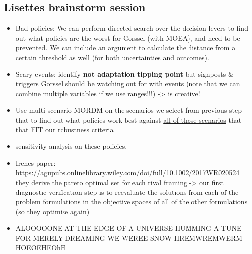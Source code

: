 \subsection{Lisettes brainstorm session}
\begin{itemize}
    \item Bad policies: We can perform directed search over the decision levers to find out what policies are the worst for Gorssel (with MOEA), and need to be prevented. We can include an argument to calculate the distance from a certain threshold as well (for both uncertainties and outcomes).
    
    
    \item Scary events: identify \textbf{not adaptation tipping point} but signposts \& triggers Gorssel should be watching out for with events (note that we can combine multiple variables if we use ranges!!!) -> is creative!
    \item Use multi-scenario MORDM on the scenarios we select from previous step that to find out what policies work best against \underline{all of those scenarios} that that FIT our robustness criteria
    \item sensitivity analysis on these policies.
    \item Irenes paper: https://agupubs.onlinelibrary.wiley.com/doi/full/10.1002/2017WR020524  they derive the pareto optimal set for each rival framing -> our first diagnostic verification step is to reevaluate the solutions from each of the problem formulations in the objective spaces of all of the other formulations (so they optimise again)
    \item ALOOOOONE AT THE EDGE OF A UNIVERSE HUMMING A TUNE FOR MERELY DREAMING WE WEREE SNOW HREMWREMWERM HOEOEHEOhH
\end{itemize}


